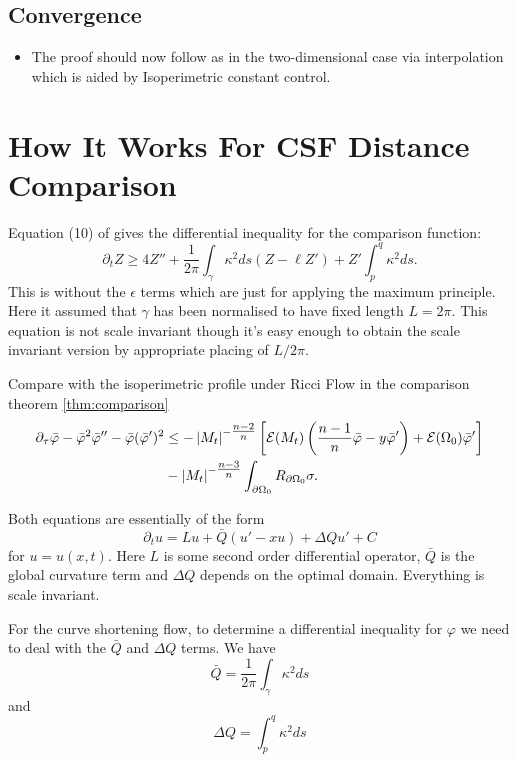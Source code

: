 \documentclass{amsart}
\begin{document}
\subsection{Convergence}

\begin{itemize}
\item The proof should now follow as in the two-dimensional case via interpolation which is aided by Isoperimetric constant control.
\end{itemize}

\subsection{}

\section{How It Works For CSF Distance Comparison}

Equation (10) of \cite{AndrewsBryan:01/2011} gives the differential inequality for the comparison function:
\[
\partial_t Z \geq 4 Z'' + \frac{1}{2\pi} \int_{\gamma} \kappa^2 ds (Z - \ell Z') + Z'\int_p^q \kappa^2 ds.
\]
This is without the \(\epsilon\) terms which are just for applying the maximum principle. Here it assumed that \(\gamma\) has been normalised to have fixed length \(L = 2\pi\). This equation is not scale invariant though it's easy enough to obtain the scale invariant version by appropriate placing of \(L/2\pi\).

Compare with the isoperimetric profile under Ricci Flow in the comparison theorem \ref{thm:comparison}
\[
\begin{split}
\partial_{\tau} \bar{\varphi} - \bar{\varphi}^2 \bar{\varphi}'' - \bar{\varphi}(\bar{\varphi}')^2 &\leq -\left|{M_t}\right|^{-\tfrac{n-2}{n}} \left[\operatorname{\mathcal{E}}(M_t)\left(\frac{n-1}{n} \bar{\varphi} - y \bar{\varphi}'\right) + \operatorname{\mathcal{E}}(\Omega_0)\bar{\varphi}'\right] \\
&- \left|{M_t}\right|^{-\tfrac{n-3}{n}}\int_{\partial {\Omega_0}} R_{\partial {\Omega_0}}\sigma.
\end{split}
\]

Both equations are essentially of the form
\[
\partial_t u = L u + \bar{Q} (u' - x u) + \Delta Q u' + C
\]
for \(u = u(x, t)\). Here \(L\) is some second order differential operator, \(\bar{Q}\) is the global curvature term and \(\Delta Q\) depends on the optimal domain. Everything is scale invariant.

For the curve shortening flow, to determine a differential inequality for \(\varphi\) we need to deal with the \(\bar{Q}\) and \(\Delta Q\) terms. We have
\[
\bar{Q} = \frac{1}{2\pi}\int_{\gamma} \kappa^2 ds
\]
and
\[
\Delta Q = \int_p^q \kappa^2 ds
\]
\end{document}
